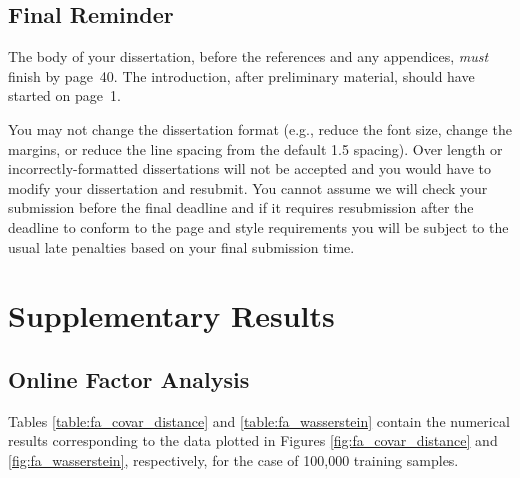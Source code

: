 \documentclass[msc,deptreport.inf]{infthesis} %
\begin{document}
\section{Final Reminder}

The body of your dissertation, before the references and any appendices,
\emph{must} finish by page~40. The introduction, after preliminary material,
should have started on page~1.

You may not change the dissertation format (e.g., reduce the font
size, change the margins, or reduce the line spacing from the default
1.5 spacing). Over length or incorrectly-formatted dissertations will
not be accepted and you would have to modify your dissertation and
resubmit.  You cannot assume we will check your submission before the
final deadline and if it requires resubmission after the deadline to
conform to the page and style requirements you will be subject to the
usual late penalties based on your final submission time.




 \appendix

 \chapter{Supplementary Results}
 
 \section{Online Factor Analysis}
 
Tables \ref{table:fa_covar_distance} and \ref{table:fa_wasserstein} contain the numerical results corresponding to the data plotted in  Figures \ref{fig:fa_covar_distance} and \ref{fig:fa_wasserstein}, respectively, for the case of 100,000 training samples. 
 
\end{document}
